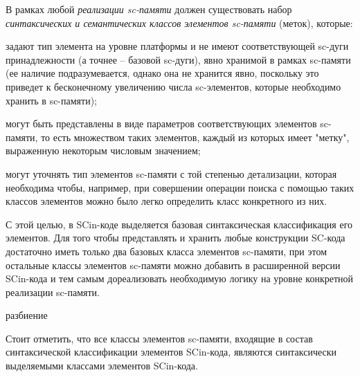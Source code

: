 В рамках любой \textit{реализации sc-памяти} должен существовать набор \textit{синтаксических и семантических классов элементов sc-памяти} (меток), которые:
\begin{textitemize}
    \item задают тип элемента на уровне платформы и не имеют соответствующей sc-дуги принадлежности (а точнее -- базовой sc-дуги), явно хранимой в рамках sc-памяти (ее наличие подразумевается, однако она не хранится явно, поскольку это приведет к бесконечному увеличению числа sc-элементов, которые необходимо хранить в sc-памяти);
    \item могут быть представлены в виде параметров соответствующих элементов sc-памяти, то есть множеством таких элементов, каждый из которых имеет "метку", выраженную некоторым числовым значением;
    \item могут уточнять тип элементов sc-памяти с той степенью детализации, которая необходима чтобы, например, при совершении операции поиска с помощью таких классов элементов можно было легко определить класс конкретного из них.
\end{textitemize}

С этой целью, в SCin-коде выделяется базовая синтаксическая классификация его элементов. Для того чтобы представлять и хранить любые конструкции SC-кода достаточно иметь только два базовых класса элементов sc-памяти, при этом остальные классы элементов sc-памяти можно добавить в расширенной версии SCin-кода и тем самым дореализовать необходимую логику на уровне конкретной реализации sc-памяти.

\begin{SCn}
\begin{scnsubstruct}

\begin{scnrelfromset}{разбиение}
\end{scnrelfromset}

\end{scnsubstruct}
\end{SCn}

Стоит отметить, что все классы элементов sc-памяти, входящие в состав синтаксической классификации элементов SCin-кода, являются синтаксически выделяемыми классами элементов SCin-кода.

